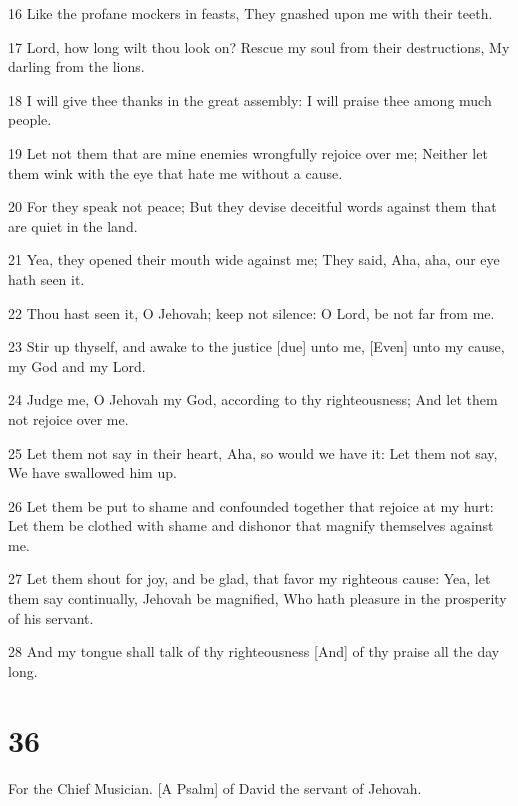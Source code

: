 \par 16 Like the profane mockers in feasts, They gnashed upon me with their teeth.
\par 17 Lord, how long wilt thou look on? Rescue my soul from their destructions, My darling from the lions.
\par 18 I will give thee thanks in the great assembly: I will praise thee among much people.
\par 19 Let not them that are mine enemies wrongfully rejoice over me; Neither let them wink with the eye that hate me without a cause.
\par 20 For they speak not peace; But they devise deceitful words against them that are quiet in the land.
\par 21 Yea, they opened their mouth wide against me; They said, Aha, aha, our eye hath seen it.
\par 22 Thou hast seen it, O Jehovah; keep not silence: O Lord, be not far from me.
\par 23 Stir up thyself, and awake to the justice [due] unto me, [Even] unto my cause, my God and my Lord.
\par 24 Judge me, O Jehovah my God, according to thy righteousness; And let them not rejoice over me.
\par 25 Let them not say in their heart, Aha, so would we have it: Let them not say, We have swallowed him up.
\par 26 Let them be put to shame and confounded together that rejoice at my hurt: Let them be clothed with shame and dishonor that magnify themselves against me.
\par 27 Let them shout for joy, and be glad, that favor my righteous cause: Yea, let them say continually, Jehovah be magnified, Who hath pleasure in the prosperity of his servant.
\par 28 And my tongue shall talk of thy righteousness [And] of thy praise all the day long.

\chapter{36}

\par For the Chief Musician. [A Psalm] of David the servant of Jehovah.


